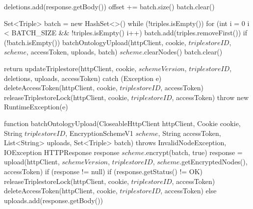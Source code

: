                     deletions.add(response.getBody())
                    offset += batch.size()
                    batch.clear()
                
            
            Set<Triple> batch = new HashSet<>()
            while (!triples.isEmpty()) 
                for (int i = 0 i < BATCH_SIZE && !triples.isEmpty() i++)
                    batch.add(triples.removeFirst())
                if (!batch.isEmpty())
                    batchOntologyUpload(httpClient, cookie, $triplestoreID$, $scheme$, accessToken, uploads, batch)
                $scheme$.clearNodes()
                batch.clear()
            
            return updateTriplestore(httpClient, cookie, $schemeVersion$, $triplestoreID$, deletions, uploads, accessToken)
         catch (Exception e) 
            deleteAccessToken(httpClient, cookie, $triplestoreID$, accessToken)
            releaseTriplestoreLock(httpClient, cookie, $triplestoreID$, accessToken)
            throw new RuntimeException(e)
        
    

function batchOntologyUpload(CloseableHttpClient httpClient, Cookie cookie, String $triplestoreID$, EncryptionSchemeV1 $scheme$, String accessToken,
                                    List<String> uploads, Set<Triple> batch) throws InvalidNodeException, IOException 
    HTTPResponse response
    $scheme$.encrypt(batch, true)
    response = upload(httpClient, $schemeVersion$, $triplestoreID$, $scheme$.getEncryptedNodes(), accessToken)
    if (response != null) 
        if (response.getStatus() != OK) 
            releaseTriplestoreLock(httpClient, cookie, $triplestoreID$, accessToken)
            deleteAccessToken(httpClient, cookie, $triplestoreID$, accessToken)
         else
            uploads.add(response.getBody())
    
